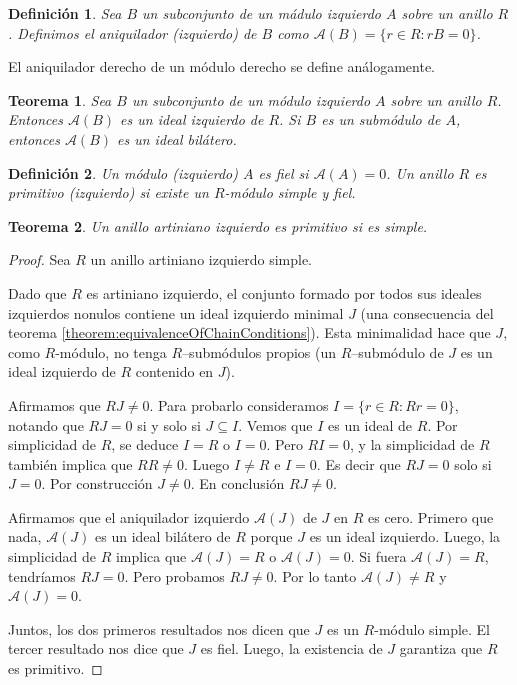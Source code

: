 \documentclass{report}
\newtheorem{theorem}{Teorema}
\newtheorem{definition}{Definición}
\begin{document}
  \begin{definition}
    Sea \(B\) un subconjunto de un mádulo izquierdo \(A\) sobre un anillo \(R\).
    Definimos el \emph{aniquilador (izquierdo)} de \(B\) como \(\mathcal{A}(B) = \{r \in R : r B = 0\}\).
  \end{definition}

  El aniquilador derecho de un módulo derecho se define análogamente.

  \begin{theorem}
    \label{theorem:anihilatorTheorem}
    Sea \(B\) un subconjunto de un módulo izquierdo \(A\) sobre un anillo \(R\).
    Entonces \(\mathcal{A}(B)\) es un ideal izquierdo de \(R\).
    Si \(B\) es un submódulo de \(A\), entonces \(\mathcal{A}(B)\) es un ideal bilátero.
  \end{theorem}

  \begin{definition}
    Un módulo (izquierdo) \(A\) es \emph{fiel} si \(\mathcal{A}(A) = 0\).
    Un anillo \(R\) es \emph{primitivo} (\emph{izquierdo}) si existe un \(R\)-módulo simple y fiel.
  \end{definition}

  \begin{theorem}
    \label{theorem:simpleLeftArtinianRingsArePrimitive}
    Un anillo artiniano izquierdo es primitivo si es simple.
  \end{theorem}
  \begin{proof}
    Sea \(R\) un anillo artiniano izquierdo simple.

    Dado que \(R\) es artiniano izquierdo, el conjunto formado por todos sus ideales izquierdos nonulos contiene un ideal izquierdo minimal \(J\) (una consecuencia del teorema \ref{theorem:equivalenceOfChainConditions}).
    Esta minimalidad hace que \(J\), como \(R\)-módulo, no tenga \(R\)--submódulos propios (un \(R\)--submódulo de \(J\) es un ideal izquierdo de \(R\) contenido en \(J\)).

    Afirmamos que \(R J \neq 0\).
    Para probarlo consideramos \(I = \{r \in R :  R r = 0\}\), notando que \(R J = 0\) si y solo si \(J \subseteq I\).
    Vemos que \(I\) es un ideal de \(R\).
    Por simplicidad de \(R\), se deduce \(I = R\) o \(I = 0\).
    Pero \(R I = 0\), y la simplicidad de \(R\) también implica que \(R R \neq 0\).
    Luego \(I \neq R\) e \(I = 0\).
    Es decir que \(R J = 0\) solo si \(J = 0\).
    Por construcción \(J \neq 0\).
    En conclusión \(R J \neq 0\).

    Afirmamos que el aniquilador izquierdo \(\mathcal{A}(J)\) de \(J\) en \(R\) es cero.
    Primero que nada, \(\mathcal{A}(J)\) es un ideal bilátero de \(R\) porque \(J\) es un ideal izquierdo.
    Luego, la simplicidad de \(R\) implica que \(\mathcal{A}(J) = R\) o \(\mathcal{A}(J) = 0\).
    Si fuera \(\mathcal{A}(J) = R\), tendríamos \(R J = 0\).
    Pero probamos \(R J \neq 0\).
    Por lo tanto \(\mathcal{A}(J) \neq R\) y \(\mathcal{A}(J) = 0\).

    Juntos, los dos primeros resultados nos dicen que \(J\) es un \(R\)-módulo simple.
    El tercer resultado nos dice que \(J\) es fiel.
    Luego, la existencia de \(J\) garantiza que \(R\) es primitivo.
  \end{proof}
\end{document}
